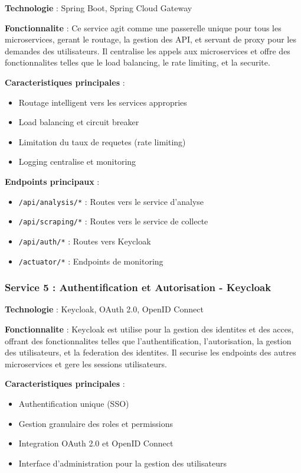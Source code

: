 \textbf{Technologie} : Spring Boot, Spring Cloud Gateway

\textbf{Fonctionnalite} : Ce service agit comme une passerelle unique pour tous les microservices, gerant le routage, la gestion des API, et servant de proxy pour les demandes des utilisateurs. Il centralise les appels aux microservices et offre des fonctionnalites telles que le load balancing, le rate limiting, et la securite.

\textbf{Caracteristiques principales} :
\begin{itemize}
    \item Routage intelligent vers les services appropries
    \item Load balancing et circuit breaker
    \item Limitation du taux de requetes (rate limiting)
    \item Logging centralise et monitoring
\end{itemize}

\textbf{Endpoints principaux} :
\begin{itemize}
    \item \texttt{/api/analysis/*} : Routes vers le service d'analyse
    \item \texttt{/api/scraping/*} : Routes vers le service de collecte
    \item \texttt{/api/auth/*} : Routes vers Keycloak
    \item \texttt{/actuator/*} : Endpoints de monitoring
\end{itemize}

\subsubsection{Service 5 : Authentification et Autorisation - Keycloak}

\textbf{Technologie} : Keycloak, OAuth 2.0, OpenID Connect

\textbf{Fonctionnalite} : Keycloak est utilise pour la gestion des identites et des acces, offrant des fonctionnalites telles que l'authentification, l'autorisation, la gestion des utilisateurs, et la federation des identites. Il securise les endpoints des autres microservices et gere les sessions utilisateurs.

\textbf{Caracteristiques principales} :
\begin{itemize}
    \item Authentification unique (SSO)
    \item Gestion granulaire des roles et permissions
    \item Integration OAuth 2.0 et OpenID Connect
    \item Interface d'administration pour la gestion des utilisateurs
\end{itemize}

